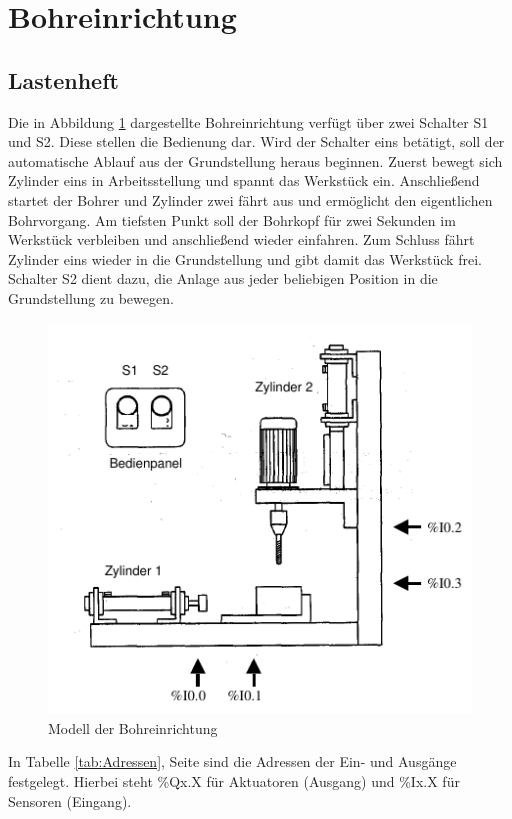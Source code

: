 \section{Bohreinrichtung}
\subsection{Lastenheft}
Die in Abbildung \ref{fig:Bohreinrichtung} dargestellte Bohreinrichtung verfügt über zwei Schalter S1 und S2. Diese stellen die Bedienung dar. Wird der Schalter eins  betätigt, soll der automatische Ablauf aus der Grundstellung heraus beginnen. Zuerst bewegt sich Zylinder eins in Arbeitsstellung und spannt das Werkstück ein. Anschließend startet der Bohrer und Zylinder zwei fährt aus und ermöglicht den eigentlichen Bohrvorgang. Am tiefsten Punkt soll der Bohrkopf für zwei Sekunden im Werkstück verbleiben und anschließend wieder einfahren. Zum Schluss fährt Zylinder eins wieder in die Grundstellung und gibt damit das Werkstück frei. Schalter S2 dient dazu, die Anlage aus jeder beliebigen Position in die Grundstellung zu bewegen.
\begin{figure}[H]
   \centering
    \includegraphics[scale=0.65]{Bilder/Aufgabenstellung.png}
    \caption[Bohreinrichtung]{Modell der Bohreinrichtung
    \footnotemark}
    \label{fig:Bohreinrichtung}
\end{figure}
In Tabelle \ref{tab:Adressen}, Seite \pageref{tab:Adressen} sind die Adressen der Ein- und Ausgänge festgelegt. Hierbei steht \%Qx.X für Aktuatoren (Ausgang) und \%Ix.X für Sensoren (Eingang). 
